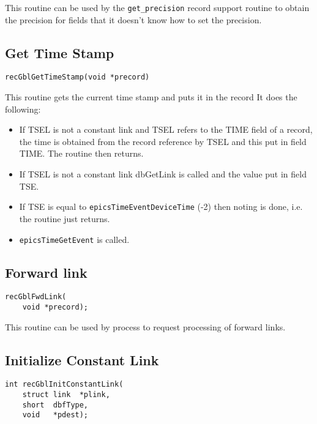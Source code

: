 This routine can be used by the \verb|get_precision| record support routine to obtain the precision for fields that it doesn't 
know how to set the precision.

\subsection{Get Time Stamp}

\begin{verbatim}
recGblGetTimeStamp(void *precord)
\end{verbatim}

This routine gets the current time stamp and puts it in the record It does the following:

\begin{itemize}
\item If TSEL is not a constant link and TSEL refers to the TIME field of a record, the time is obtained from the record reference by TSEL and this put in field TIME.
The routine then returns.

\item If TSEL is not a constant link dbGetLink is called and the value put in field TSE.

\item If TSE is equal to \verb|epicsTimeEventDeviceTime| (-2) then noting is done, i.e. the routine just returns.

\item \verb|epicsTimeGetEvent| is called.

\end{itemize}

\subsection{Forward link}

\begin{verbatim}
recGblFwdLink(
    void *precord);
\end{verbatim}

This routine can be used by process to request processing of forward links.

\subsection{Initialize Constant Link}

\begin{verbatim}
int recGblInitConstantLink(
    struct link  *plink,
    short  dbfType,
    void   *pdest);
\end{verbatim}

